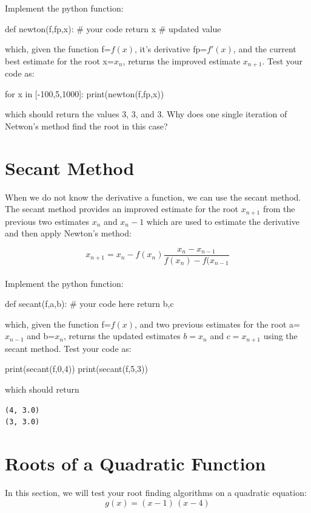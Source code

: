 \plot Implement the python function:
\begin{python}
def newton(f,fp,x):
    # your code
    return x # updated value
\end{python}
which, given the function f=$f(x)$, it's derivative fp=$f'(x)$, and the current best estimate for the root x=$x_n$, 
returns the improved estimate $x_{n+1}$.  Test your code as:
\begin{python}
for x in [-100,5,1000]:
   print(newton(f,fp,x))
\end{python}
which should return the values $3$, $3$, and $3$.  Why does one single iteration of Netwon's method find the root in this case?

\section{Secant Method}

When we do not know the derivative a function, we can use the secant
method.  The secant method provides an improved estimate for the root
$x_{n+1}$ from the previous two estimates $x_n$ and $x_n-1$ which are used to 
estimate the derivative and then apply Newton's method:

\begin{displaymath}
x_{n+1} = x_n - f(x_n) \frac{x_n-x_{n-1}}{f(x_n) - f(x_{n-1}}
\end{displaymath}\\

\plot Implement the python function:
\begin{python}
def secant(f,a,b):
   # your code here  
   return b,c  
\end{python}
which, given the function f=$f(x)$, and two previous estimates for the root a=$x_{n-1}$ and b=$x_n$, returns the updated estimates $b=x_n$ and $c=x_{n+1}$ using the secant method.  Test your code as:
\begin{python}
print(secant(f,0,4))
print(secant(f,5,3))
\end{python}
which should return
\begin{verbatim}
(4, 3.0)
(3, 3.0)
\end{verbatim}

\section{Roots of a Quadratic Function}

In this section, we will test your root finding algorithms on a quadratic equation:
\begin{equation}
  g(x) = (x-1) \, (x-4)
\end{equation}


